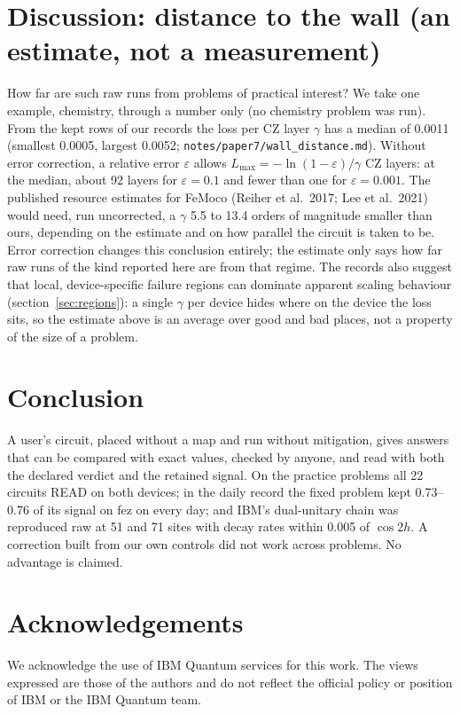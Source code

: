 \documentclass[10pt,a4paper]{article}
\begin{document}
\section{Discussion: distance to the wall (an estimate, not a measurement)}
How far are such raw runs from problems of practical interest? We take one example, chemistry, through a number only
(no chemistry problem was run). From the kept rows of our records the loss per CZ layer $\gamma$ has a median of
0.0011 (smallest 0.0005, largest 0.0052; \texttt{notes/paper7/wall\_distance.md}). Without error correction, a
relative error $\varepsilon$ allows $L_\mathrm{max} = -\ln(1-\varepsilon)/\gamma$ CZ layers: at the median, about
92 layers for $\varepsilon = 0.1$ and fewer than one for $\varepsilon = 0.001$. The published resource estimates for
FeMoco (Reiher et al.\ 2017; Lee et al.\ 2021) would need, run uncorrected, a $\gamma$ 5.5 to 13.4 orders of
magnitude smaller than ours, depending on the estimate and on how parallel the circuit is taken to be. Error
correction changes this conclusion entirely; the estimate only says how far raw runs of the kind reported here are
from that regime. The records also suggest that local, device-specific failure regions can dominate apparent scaling
behaviour (section~\ref{sec:regions}): a single $\gamma$ per device hides where on the device the loss sits, so the
estimate above is an average over good and bad places, not a property of the size of a problem.

\section{Conclusion}
A user's circuit, placed without a map and run without mitigation, gives answers that can be compared with exact
values, checked by anyone, and read with both the declared verdict and the retained signal. On the practice problems
all 22 circuits READ on both devices; in the daily record the fixed problem kept 0.73--0.76 of its signal on fez on
every day; and IBM's dual-unitary chain was reproduced raw at 51 and 71 sites with decay rates within 0.005 of
$\cos 2h$. A correction built from our own controls did not work across problems. No advantage is claimed.

\section*{Acknowledgements}
We acknowledge the use of IBM Quantum services for this work. The views expressed are those of the authors and do not
reflect the official policy or position of IBM or the IBM Quantum team.
\end{document}
